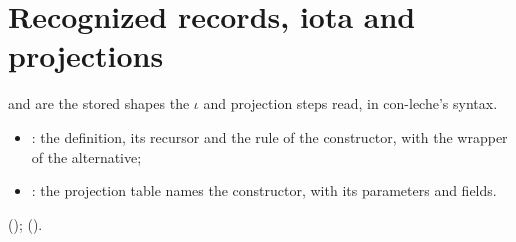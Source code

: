 \section{Recognized records, iota and projections}\label{sec:semantics-iota}

\begin{definition}
  \label{def:EraseProof-SemCases-CasesIotaAt}
  \leanok
    and  are the stored shapes the $\iota$ and projection steps read, in con-leche's syntax.
  \begin{itemize}
  \item {}: the  definition, its recursor and the rule of the constructor, with the wrapper of the alternative;
  \item {}: the projection table names the constructor, with its parameters and fields.
  \end{itemize}
    ();  ().
\end{definition}

